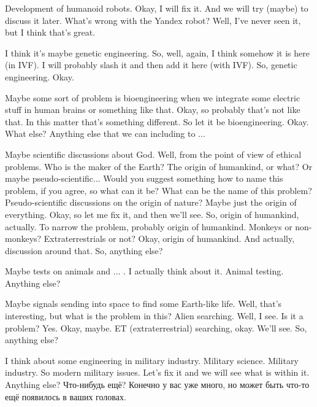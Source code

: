 \documentclass[main.tex]{subfiles}
\begin{document}
Development of humanoid robots.
Okay, I will fix it.
And we will try (maybe) to discuss it later.
What's wrong with the Yandex robot?
Well, I've never seen it, but I think that's great.

I think it's maybe genetic engineering.
So, well, again, I think somehow it is here (in IVF).
I will probably slash it and then add it here (with IVF).
So, genetic engineering.
Okay.

Maybe some sort of problem is bioengineering when we integrate some electric stuff in human brains or something like that.
Okay, so probably that's not like that.
In this matter that's something different.
So let it be bioengineering.
Okay.
What else?
Anything else that we can including to ...

Maybe scientific discussions about God.
Well, from the point of view of ethical problems.
Who is the maker of the Earth?
The origin of humankind, or what?
Or maybe pseudo-scientific...
Would you suggest something how to name this problem, if you agree, so what can it be?
What can be the name of this problem?
Pseudo-scientific discussions on the origin of nature?
Maybe just the origin of everything.
Okay, so let me fix it, and then we'll see.
So, origin of humankind, actually.
To narrow the problem, probably origin of humankind.
Monkeys or non-monkeys?
Extraterrestrials or not?
Okay, origin of humankind.
And actually, discussion around that.
So, anything else?

Maybe tests on animals and ... .
I actually think about it.
Animal testing.
Anything else?

Maybe signals sending into space to find some Earth-like life.
Well, that's interesting, but what is the problem in this?
Alien searching.
Well, I see.
Is it a problem? Yes.
Okay, maybe.
ET (extraterrestrial) searching, okay.
We'll see.
So, anything else?

I think about some engineering in military industry.
Military science.
Military industry.
So modern military issues.
Let's fix it and we will see what is within it.
Anything else?
Что-нибудь ещё?
Конечно у вас уже много, но может быть что-то ещё появилось в ваших головах.
\end{document}
